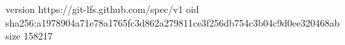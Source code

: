 version https://git-lfs.github.com/spec/v1
oid sha256:a1978904a71e78a1765fc3d862a279811ce3f256db754c3b04c9d0ee320468ab
size 158217
